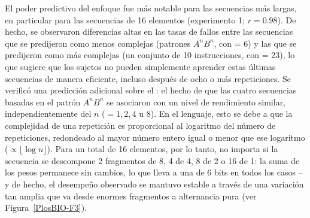 El poder predictivo del enfoque \lot fue más notable para las secuencias más largas, en particular para las secuencias de 16 elementos (experimento 1; $r = 0.98$). De hecho, se observaron diferencias altas en las tasas de fallos entre las secuencias que se predijeron como menos complejas (patrones $A^nB^n$, con \mdlbin = 6) y las que se predijeron como más complejas (un conjunto de 10 instrucciones, con \mdlbin = 23), lo que sugiere que los sujetos no pueden simplemente aprender estas últimas secuencias de manera eficiente, incluso después de ocho o más repeticiones. Se verificó una predicción adicional sobre el \lot: el hecho de que las cuatro secuencias basadas en el patrón $A^nB^n$ se asociaron con un nivel de rendimiento similar, independientemente del $n$ ($= 1, 2, 4$ u $8$). En el lenguaje, esto se debe a que la complejidad de una repetición es proporcional al logaritmo del número de repeticiones, redondeado al mayor número entero igual o menor que ese logaritmo ($\propto \lfloor \log n \rfloor$). Para un total de 16 elementos, por lo tanto, no importa si la secuencia se descompone 2 fragmentos de 8, 4 de 4, 8 de 2 o 16 de 1: la suma de los pesos permanece sin cambios, lo que lleva a una \mdlbin de 6 bits en todos los casos --y de hecho, el desempeño observado se mantuvo estable a través de una variación tan amplia que va desde enormes fragmentos a alternancia pura (ver Figura~\ref{PlosBIO-F3}).


